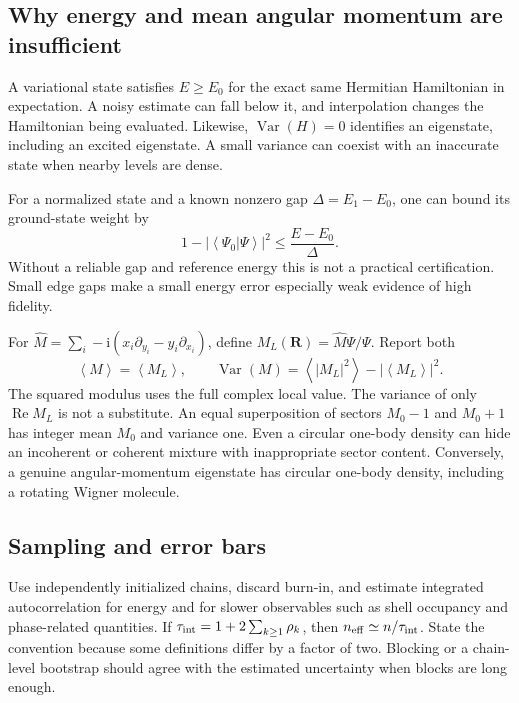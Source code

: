 \documentclass[11pt,letterpaper]{article}
\newcommand{\R}{\mathbf R}
\newcommand{\ii}{\mathrm i}
\newcommand{\avg}[1]{\left\langle #1\right\rangle}
\begin{document}
\subsection{Why energy and mean angular momentum are insufficient}

A variational state satisfies $E\ge E_0$ for the exact same Hermitian Hamiltonian in expectation. A noisy estimate can fall below it, and interpolation changes the Hamiltonian being evaluated. Likewise, $\operatorname{Var}(H)=0$ identifies an eigenstate, including an excited eigenstate. A small variance can coexist with an inaccurate state when nearby levels are dense.

For a normalized state and a known nonzero gap $\Delta=E_1-E_0$, one can bound its ground-state weight by
\begin{equation}
 1-|\avg{\Psi_0|\Psi}|^2\le\frac{E-E_0}{\Delta}.
\end{equation}
Without a reliable gap and reference energy this is not a practical certification. Small edge gaps make a small energy error especially weak evidence of high fidelity.

For $\hat M=\sum_i-\ii(x_i\partial_{y_i}-y_i\partial_{x_i})$, define $M_L(\R)=\hat M\Psi/\Psi$. Report both
\begin{equation}
 \avg M=\avg{M_L},\qquad
 \operatorname{Var}(M)=\avg{|M_L|^2}-|\avg{M_L}|^2.
 \label{eq:Mvar}
\end{equation}
The squared modulus uses the full complex local value. The variance of only $\operatorname{Re}M_L$ is not a substitute. An equal superposition of sectors $M_0-1$ and $M_0+1$ has integer mean $M_0$ and variance one. Even a circular one-body density can hide an incoherent or coherent mixture with inappropriate sector content. Conversely, a genuine angular-momentum eigenstate has circular one-body density, including a rotating Wigner molecule.

\subsection{Sampling and error bars}

Use independently initialized chains, discard burn-in, and estimate integrated autocorrelation for energy and for slower observables such as shell occupancy and phase-related quantities. If $\tau_{\rm int}=1+2\sum_{k\ge1}\rho_k$, then $n_{\rm eff}\simeq n/\tau_{\rm int}$. State the convention because some definitions differ by a factor of two. Blocking or a chain-level bootstrap should agree with the estimated uncertainty when blocks are long enough.
\end{document}
